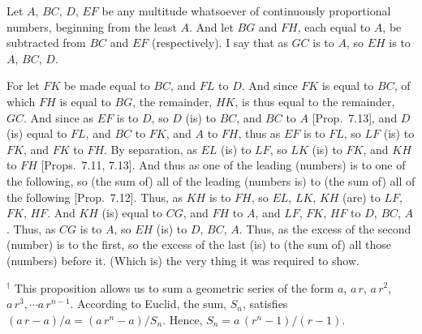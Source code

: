 \begin{Parallel}{}{}
{Let $A$, $BC$, $D$, $EF$ be any multitude whatsoever of continuously proportional numbers, beginning from the least $A$.  And let $BG$ and
$FH$, each equal to $A$, be subtracted from $BC$ and $EF$ (respectively). I say that as $GC$ is to $A$, so $EH$ is to $A$, $BC$, $D$.

For let $FK$ be made equal to $BC$, and $FL$ to  $D$. And since $FK$
is equal to $BC$, of which $FH$ is equal to $BG$, the remainder,
$HK$,  is thus equal to the remainder, $GC$. And since as $EF$ is to $D$, so
$D$ (is) to $BC$, and $BC$ to $A$ [Prop.~7.13],
and $D$ (is) equal to $FL$, and $BC$ to $FK$, and $A$ to  $FH$, thus
as $EF$ is to $FL$, so $LF$ (is) to $FK$, and $FK$ to $FH$. By
separation, as $EL$ (is) to $LF$, so $LK$ (is) to $FK$, and $KH$ to $FH$
[Props.~7.11, 7.13]. And thus
as one of the leading (numbers) is to one of the following, so (the sum of) all of the leading (numbers is) to (the sum of) all of the following [Prop.~7.12]. Thus, as $KH$ is to $FH$, so
$EL$, $LK$, $KH$ (are) to $LF$, $FK$, $HF$.  And $KH$ (is) equal to
$CG$, and $FH$ to $A$, and $LF$, $FK$, $HF$ to $D$, $BC$, $A$.
Thus, as $CG$ is to $A$, so $EH$ (is) to $D$, $BC$, $A$. Thus,
as the excess of the second (number) is to the first, so the excess of the last
(is) to (the sum of) all  those (numbers) before it. (Which is) the very thing it was required to show.}
\end{Parallel}
{\footnotesize\noindent$^\dag$ This proposition allows us to sum a geometric series of the form $a$, $a\,r$, $a\,r^2$, $a\,r^3,\cdots a\,r^{n-1}$. 
According to Euclid, the sum, $S_n$,  satisfies
$(a\,r-a)/a = (a\,r^n-a)/S_n$. Hence, $S_n= a\,(r^n-1)/(r-1)$.}

